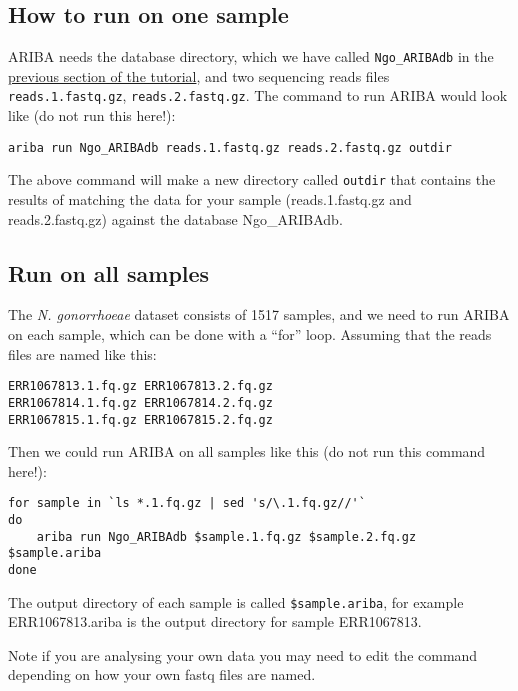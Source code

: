 \documentclass[11pt]{article}
\begin{document}
    \hypertarget{how-to-run-on-one-sample}{%
\subsection{How to run on one sample}\label{how-to-run-on-one-sample}}

ARIBA needs the database directory, which we have called
\texttt{Ngo\_ARIBAdb} in the \href{make_custom_db.ipynb}{previous
section of the tutorial}, and two sequencing reads files
\texttt{reads.1.fastq.gz}, \texttt{reads.2.fastq.gz}. The command to run
ARIBA would look like (do not run this here!):

\begin{verbatim}
ariba run Ngo_ARIBAdb reads.1.fastq.gz reads.2.fastq.gz outdir
\end{verbatim}

The above command will make a new directory called \texttt{outdir} that
contains the results of matching the data for your sample
(reads.1.fastq.gz and reads.2.fastq.gz) against the database
Ngo\_ARIBAdb.

    \hypertarget{run-on-all-samples}{%
\subsection{Run on all samples}\label{run-on-all-samples}}

The \textit{N. gonorrhoeae} dataset consists of 1517 samples, and we need
to run ARIBA on each sample, which can be done with a ``for'' loop.
Assuming that the reads files are named like this:

\begin{verbatim}
ERR1067813.1.fq.gz ERR1067813.2.fq.gz
ERR1067814.1.fq.gz ERR1067814.2.fq.gz
ERR1067815.1.fq.gz ERR1067815.2.fq.gz
\end{verbatim}

Then we could run ARIBA on all samples like this (do not run this
command here!):

\begin{verbatim}
for sample in `ls *.1.fq.gz | sed 's/\.1.fq.gz//'`
do
    ariba run Ngo_ARIBAdb $sample.1.fq.gz $sample.2.fq.gz $sample.ariba
done
\end{verbatim}

The output directory of each sample is called \texttt{\$sample.ariba},
for example ERR1067813.ariba is the output directory for sample
ERR1067813.

Note if you are analysing your own data you may need to edit the command
depending on how your own fastq files are named.
\end{document}
